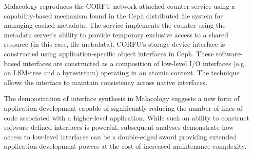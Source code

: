 Malacology reproduces the CORFU network-attached counter service using a
capability-based mechanism found in the Ceph distributed file system for
managing cached metadata. The service implements the counter using the metadata server's ability to provide temporary
exclusive access to a shared resource (in this case, file metadata). CORFU's storage device interface is
constructed using application-specific object interfaces in Ceph. These
software-based interfaces are constructed as a composition of low-level I/O
interfaces (e.g. an LSM-tree and a bytestream) operating in an atomic
context. The technique allows the interface to maintain consistency across native
interfaces.

The demonstration of interface synthesis in Malacology suggests a new form of
application development capable of significantly reducing the number of lines of code associated with a higher-level application.
While such an ability to construct software-defined interfaces is powerful,
subsequent analyses demonstrate how access to low-level interfaces can be a double-edged
sword providing extended application development powers at the cost of increased maintenance complexity.
